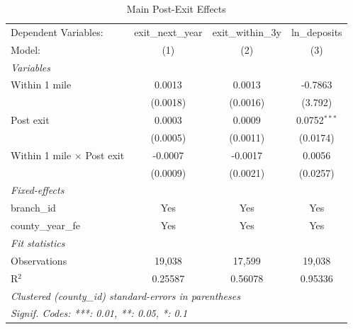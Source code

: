 
\begin{table}[htbp]
   \caption{Main Post-Exit Effects}
   \label{tab:main_effects}
   \centering
   \begin{tabular}{lccc}
      \tabularnewline \midrule \midrule
      Dependent Variables:              & exit\_next\_year   & exit\_within\_3y   & ln\_deposits\\   
      Model:                            & (1)                & (2)                & (3)\\  
      \midrule
      \emph{Variables}\\
      Within 1 mile                     & 0.0013             & 0.0013             & -0.7863\\   
                                        & (0.0018)           & (0.0016)           & (3.792)\\   
      Post exit                         & 0.0003             & 0.0009             & 0.0752$^{***}$\\   
                                        & (0.0005)           & (0.0011)           & (0.0174)\\   
      Within 1 mile $\times$ Post exit  & -0.0007            & -0.0017            & 0.0056\\   
                                        & (0.0009)           & (0.0021)           & (0.0257)\\   
      \midrule
      \emph{Fixed-effects}\\
      branch\_id                        & Yes                & Yes                & Yes\\  
      county\_year\_fe                  & Yes                & Yes                & Yes\\  
      \midrule
      \emph{Fit statistics}\\
      Observations                      & 19,038             & 17,599             & 19,038\\  
      R$^2$                             & 0.25587            & 0.56078            & 0.95336\\  
      \midrule \midrule
      \multicolumn{4}{l}{\emph{Clustered (county\_id) standard-errors in parentheses}}\\
      \multicolumn{4}{l}{\emph{Signif. Codes: ***: 0.01, **: 0.05, *: 0.1}}\\
   \end{tabular}
\end{table}


